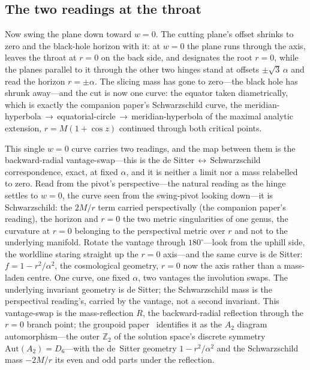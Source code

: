 \documentclass[11pt,a4paper]{article}
\theoremstyle{definition}
\begin{document}
\subsection{The two readings at the throat}\label{sec:two-readings}

Now swing the plane down toward $w=0$. The cutting plane's offset shrinks to zero and the black-hole horizon with it: at $w=0$ the plane runs through the axis, leaves the throat at $r=0$ on the back side, and designates the root $r=0$, while the planes parallel to it through the other two hinges stand at offsets $\pm\sqrt3\,\alpha$ and read the horizon $r=\pm\alpha$. The slicing mass has gone to zero---the black hole has shrunk away---and the cut is now one curve: the equator taken diametrically, which is exactly the companion paper's Schwarzschild curve, the meridian-hyperbola\,$\to$\,equatorial-circle\,$\to$\,meridian-hyperbola of the maximal analytic extension, $r=M(1+\cos z)$ continued through both critical points.

This single $w=0$ curve carries two readings, and the map between them is the backward-radial vantage-swap---this is the de Sitter\,$\leftrightarrow$\,Schwarzschild correspondence, exact, at fixed $\alpha$, and it is neither a limit nor a mass relabelled to zero. Read from the pivot's perspective---the natural reading as the hinge settles to $w=0$, the curve seen from the swing-pivot looking down---it is Schwarzschild: the $2M/r$ term carried perspectivally (the companion paper's reading), the horizon and $r=0$ the two metric singularities of one genus, the curvature at $r=0$ belonging to the perspectival metric over $r$ and not to the underlying manifold. Rotate the vantage through $180^{\circ}$---look from the uphill side, the worldline staring straight up the $r=0$ axis---and the same curve is de Sitter: $f=1-r^{2}/\alpha^{2}$, the cosmological geometry, $r=0$ now the axis rather than a mass-laden centre. One curve, one fixed $\alpha$, two vantages the involution swaps. The underlying invariant geometry is de Sitter; the Schwarzschild mass is the perspectival reading's, carried by the vantage, not a second invariant. This vantage-swap is the mass-reflection $R$, the backward-radial reflection through the $r=0$ branch point; the groupoid paper~\cite{JanzenGroupoid} identifies it as the $A_{2}$ diagram automorphism---the outer $\mathbb{Z}_{2}$ of the solution space's discrete symmetry $\mathrm{Aut}(A_{2})=D_{6}$---with the de~Sitter geometry $1-r^{2}/\alpha^{2}$ and the Schwarzschild mass $-2M/r$ its even and odd parts under the reflection.
\end{document}
